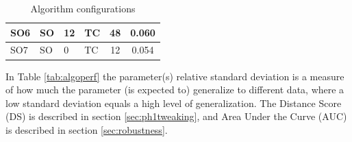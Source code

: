 \begin{table}
\begin{tabular}{| l | l | p{2cm} | p{2cm} | c | c | }
    SO6 & SO & 12 & TC & 48 & 0.060 \\\hline
    SO7 & SO & 0 & TC & 12 & 0.054 \\\hline\hline
%
%
  \end{tabular}
\caption{Algorithm configurations}
\label{tab:algoconfigs}
\end{table}
%
In Table \ref{tab:algoperf} the parameter(s) relative standard deviation is a measure of how much the parameter (is expected to) generalize to different data, where a low standard deviation equals a high level of generalization. The Distance Score (DS) is described in section \ref{sec:ph1tweaking}, and Area Under the Curve (AUC) is described in section \ref{sec:robustness}.\\
%
